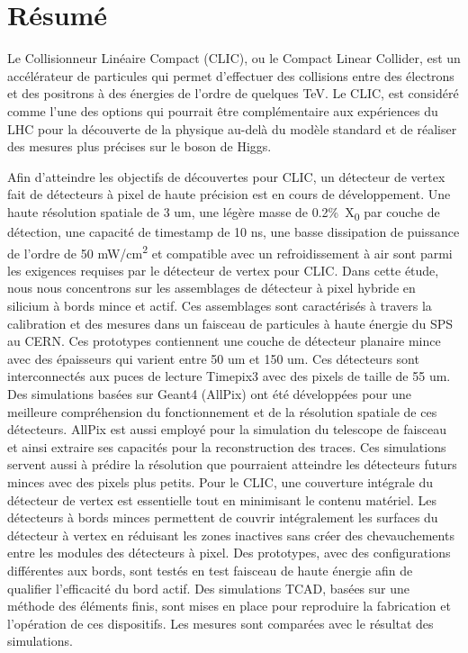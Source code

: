 \chapter*{Résumé}


Le Collisionneur Linéaire Compact (CLIC), ou le Compact Linear
Collider, est un accélérateur de particules qui permet d'effectuer des
collisions entre des électrons et des positrons à des énergies de
l'ordre de quelques TeV. Le CLIC, est considéré comme l’une des
options qui pourrait être complémentaire aux expériences du LHC pour
la découverte de la physique au-delà du modèle standard et de réaliser
des mesures plus précises sur le boson de Higgs.

Afin d'atteindre les objectifs de découvertes pour CLIC, un détecteur
de vertex fait de détecteurs à pixel de haute précision est en cours
de développement. Une haute résolution spatiale de 3 um, une légère
masse de 0.2\%~X\textsubscript{0} par couche de détection, une
capacité de timestamp de 10 ns, une basse dissipation de puissance de
l’ordre de 50 mW/cm\textsuperscript{2} et compatible avec un
refroidissement à air sont parmi les exigences requises par le
détecteur de vertex pour CLIC. Dans cette étude, nous nous concentrons
sur les assemblages de détecteur à pixel hybride en silicium à bords
mince et actif. Ces assemblages sont caractérisés à travers la
calibration et des mesures dans un faisceau de particules à haute
énergie du SPS au CERN. Ces prototypes contiennent une couche de
détecteur planaire mince avec des épaisseurs qui varient entre 50 um
et 150 um. Ces détecteurs sont interconnectés aux puces de lecture
Timepix3 avec des pixels de taille de 55 um. Des simulations basées
sur Geant4 (AllPix) ont été développées pour une meilleure
compréhension du fonctionnement et de la résolution spatiale de ces
détecteurs. AllPix est aussi employé pour la simulation du telescope
de faisceau et ainsi extraire ses capacités pour la reconstruction des
traces. Ces simulations servent aussi à prédire la résolution que
pourraient atteindre les détecteurs futurs minces avec des pixels plus
petits. Pour le CLIC, une couverture intégrale du détecteur de vertex
est essentielle tout en minimisant le contenu matériel. Les détecteurs
à bords minces permettent de couvrir intégralement les surfaces du
détecteur à vertex en réduisant les zones inactives sans créer des
chevauchements entre les modules des détecteurs à pixel. Des
prototypes, avec des configurations différentes aux bords, sont testés
en test faisceau de haute énergie afin de qualifier l’efficacité du
bord actif. Des simulations TCAD, basées sur une méthode des éléments
finis, sont mises en place pour reproduire la fabrication et
l’opération de ces dispositifs. Les mesures sont comparées avec le
résultat des simulations.


